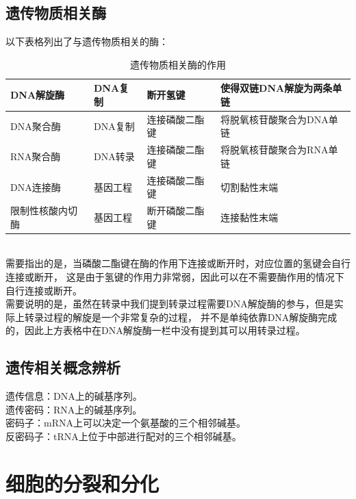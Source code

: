 \documentclass[UTF8]{ctexart}
\begin{document}
\subsection{遗传物质相关酶}
    以下表格列出了与遗传物质相关的酶：
    \begin{table}[h]
        \begin{center}
            \begin{tabular}{l|l|l|l}
                \hline
                DNA解旋酶\qquad\qquad&DNA复制&断开氢键\qquad\qquad&使得双链DNA解旋为两条单链\qquad\qquad\\ \hline
                DNA聚合酶\qquad\qquad&DNA复制&连接磷酸二酯键\qquad\qquad&将脱氧核苷酸聚合为DNA单链\\ \hline
                RNA聚合酶\qquad\qquad&DNA转录&连接磷酸二酯键\qquad\qquad&将脱氧核苷酸聚合为RNA单链\\ \hline
                DNA连接酶\qquad\qquad&基因工程&连接磷酸二酯键\qquad\qquad&切割黏性末端\\ \hline
                限制性核酸内切酶\qquad\qquad&基因工程&断开磷酸二酯键\qquad\qquad&连接黏性末端\\ \hline
            \end{tabular}
            \caption{遗传物质相关酶的作用}
        \end{center}
    \end{table}\\
    需要指出的是，当磷酸二酯键在酶的作用下连接或断开时，对应位置的氢键会自行连接或断开，
    这是由于氢键的作用力非常弱，因此可以在不需要酶作用的情况下自行连接或断开。\\[3mm]
    需要说明的是，虽然在转录中我们提到转录过程需要DNA解旋酶的参与，但是实际上转录过程的解旋是一个非常复杂的过程，
    并不是单纯依靠DNA解旋酶完成的，因此上方表格中在DNA解旋酶一栏中没有提到其可以用转录过程。\\

\subsection{遗传相关概念辨析}
    遗传信息：DNA上的碱基序列。\\[3mm]
    遗传密码：RNA上的碱基序列。\\[3mm]
    密码子：mRNA上可以决定一个氨基酸的三个相邻碱基。\\[3mm]
    反密码子：tRNA上位于中部进行配对的三个相邻碱基。

\newpage

\section{细胞的分裂和分化}
\end{document}
